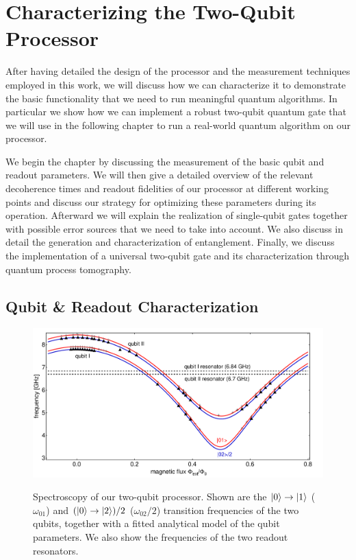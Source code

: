 \chapter{Characterizing the Two-Qubit Processor} \label{chapter:processor_characterization}

After having detailed the design of the processor and the measurement techniques employed in this work, we will discuss how we can characterize it to demonstrate the basic functionality that we need to run meaningful quantum algorithms. In particular we show how we can implement a robust two-qubit quantum gate that we will use in the following chapter to run a real-world quantum algorithm on our processor.

\smallskip

We begin the chapter by discussing the measurement of the basic qubit and readout parameters. We will then give a detailed overview of the relevant decoherence times and readout fidelities of our processor at different working points and discuss our strategy for optimizing these parameters during its operation. Afterward we will explain the realization of single-qubit gates together with possible error sources that we need to take into account. We also discuss in detail the generation and characterization of entanglement. Finally, we discuss the implementation of a universal two-qubit gate and its characterization through quantum process tomography.

\section{Qubit \& Readout Characterization}

\begin{figure}[ht!]
	\centering
		\includegraphics[width=1.\textwidth]{"./data/ct5/qubit frequencies/qubit_spectroscopy"}
	\label{fig:ProcessorSpectroscopy}
	\caption[Spectroscopy of the Two-Qubit Processor]{Spectroscopy of our two-qubit processor. Shown are the $\left| 0 \right>\to\left| 1 \right>$ ($\omega_{01}$) and $(\left| 0 \right>\to\left| 2 \right>)/2$ ($\omega_{02}/2$) transition frequencies of the two qubits, together with a fitted analytical model of the qubit parameters. We also show the frequencies of the two readout resonators.}
\end{figure}

